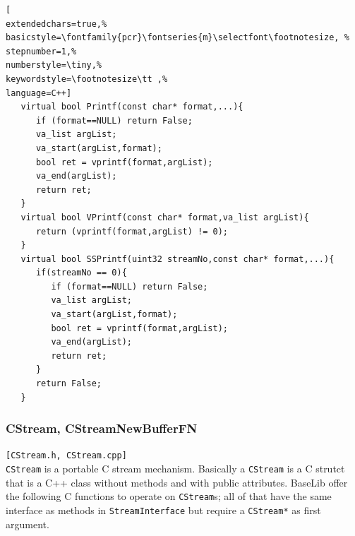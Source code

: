 \begin{lstlisting}[
extendedchars=true,%
basicstyle=\fontfamily{pcr}\fontseries{m}\selectfont\footnotesize, %
stepnumber=1,%
numberstyle=\tiny,%
keywordstyle=\footnotesize\tt ,%
language=C++]
   virtual bool Printf(const char* format,...){
      if (format==NULL) return False;
      va_list argList;
      va_start(argList,format);
      bool ret = vprintf(format,argList);
      va_end(argList);
      return ret;
   }
   virtual bool VPrintf(const char* format,va_list argList){
      return (vprintf(format,argList) != 0);
   }
   virtual bool SSPrintf(uint32 streamNo,const char* format,...){
      if(streamNo == 0){
         if (format==NULL) return False;
         va_list argList;
         va_start(argList,format);
         bool ret = vprintf(format,argList);
         va_end(argList);
         return ret;
      }
      return False;
   }
\end{lstlisting}



\subsubsection{CStream, CStreamNewBufferFN}
\texttt{[CStream.h, CStream.cpp]}\\
\texttt{CStream} is a portable C stream mechanism. Basically a \texttt{CStream} is a C strutct that is a C++ class without methods and with public attributes.
BaseLib offer the following C functions to operate on \texttt{CStream}s; all of that have the same interface as methods in \texttt{StreamInterface} but require a \texttt{CStream*} as first argument.

